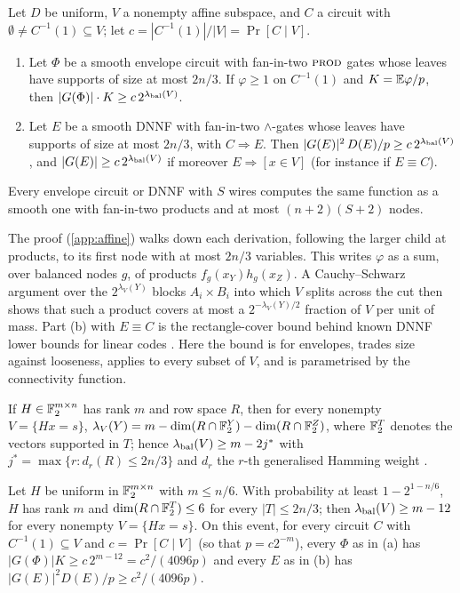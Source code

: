 \begin{theorem}\label{thm:parity-barrier}
Let $D$ be uniform, $V$ a nonempty affine subspace, and $C$ a circuit with
$\emptyset\ne C^{-1}(1)\subseteq V$; let $c=|C^{-1}(1)|/|V|=\Pr[C\mid V]$.
\begin{enumerate}[label=(\alph*)]
\item Let $\Phi$ be a smooth envelope circuit with fan-in-two $\textsc{prod}$ gates whose
leaves have supports of size at most $2n/3$. If $\varphi\ge1$ on $C^{-1}(1)$ and
$K=\mathbb{E}\varphi/p$, then $|G(\Phi)|\cdot K\ge c\,2^{\lambda_{\rm bal}(V)}$.
\item Let $E$ be a smooth DNNF with fan-in-two $\wedge$-gates whose leaves have
supports of size at most $2n/3$, with $C\Rightarrow E$. Then
$|G(E)|^2\,D(E)/p\ge c\,2^{\lambda_{\rm bal}(V)}$, and $|G(E)|\ge c\,2^{\lambda_{\rm
bal}(V)}$ if moreover $E\Rightarrow[x\in V]$ (for instance if $E\equiv C$).
\end{enumerate}
Every envelope circuit or DNNF with $S$ wires computes the same function as a smooth
one with fan-in-two products and at most $(n+2)(S+2)$ nodes.
\end{theorem}

The proof (\cref{app:affine}) walks down each derivation, following the larger
child at products, to its first node with at most $2n/3$ variables. This writes
$\varphi$ as a sum, over balanced nodes $g$, of products $f_g(x_Y)h_g(x_Z)$. A
Cauchy--Schwarz argument over the $2^{\lambda_V(Y)}$ blocks $A_i\times B_i$ into which
$V$ splits across the cut then shows that such a product covers at most a
$2^{-\lambda_V(Y)/2}$ fraction of $V$ per unit of mass. Part (b) with $E\equiv C$
is the rectangle-cover bound behind known DNNF lower bounds for linear codes
\cite{duris2004,bova2016}. Here the bound is for envelopes, trades size against
looseness, applies to every subset of $V$, and is parametrised by the connectivity
function.

\begin{corollary}\label{cor:parity-ghw}
If $H\in\mathbb{F}_2^{m\times n}$ has rank $m$ and row space $R$, then for every nonempty
$V=\{Hx=s\}$, $\lambda_V(Y)=m-\dim(R\cap\mathbb{F}_2^Y)-\dim(R\cap\mathbb{F}_2^Z)$, where $\mathbb{F}_2^T$
denotes the vectors supported in $T$; hence $\lambda_{\rm bal}(V)\ge m-2j^*$ with
$j^*=\max\{r:d_r(R)\le2n/3\}$ and $d_r$ the $r$-th generalised Hamming weight
\cite{wei1991}.
\end{corollary}

\begin{corollary}\label{cor:random-parity}
Let $H$ be uniform in $\mathbb{F}_2^{m\times n}$ with $m\le n/6$. With probability at least
$1-2^{1-n/6}$, $H$ has rank $m$ and $\dim(R\cap\mathbb{F}_2^T)\le6$ for every $|T|\le2n/3$;
then $\lambda_{\rm bal}(V)\ge m-12$ for every nonempty $V=\{Hx=s\}$. On this event,
for every circuit $C$ with $C^{-1}(1)\subseteq V$ and $c=\Pr[C\mid V]$ (so that
$p=c2^{-m}$), every $\Phi$ as in (a) has $|G(\Phi)|K\ge c\,2^{m-12}=c^2/(4096p)$ and
every $E$ as in (b) has $|G(E)|^2D(E)/p\ge c^2/(4096p)$.
\end{corollary}

